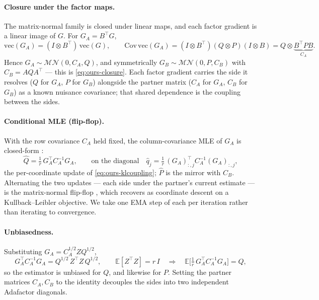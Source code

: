 \documentclass[11pt]{article}
\newcommand{\E}{\mathbb{E}}
\theoremstyle{plain}
\theoremstyle{definition}
\theoremstyle{remark}
\begin{document}
\paragraph{Closure under the factor maps.} The matrix-normal family is closed under
linear maps, and each factor gradient is a linear image of $G$. For $G_A=B^\top G$,
\begin{equation*}
  \mathrm{vec}(G_A)=(I\otimes B^\top)\,\mathrm{vec}(G),\qquad
  \mathrm{Cov}\,\mathrm{vec}(G_A)=(I\otimes B^\top)(Q\otimes P)(I\otimes B)
  =Q\otimes\underbrace{B^\top P B}_{C_A}.
\end{equation*}
Hence $G_A\sim\mathcal{MN}(0,C_A,Q)$, and symmetrically $G_B\sim\mathcal{MN}(0,P,C_B)$
with $C_B=AQA^\top$ --- this is \eqref{eq:ours-closure}. Each factor gradient carries
the side it resolves ($Q$ for $G_A$, $P$ for $G_B$) alongside the partner matrix ($C_A$ for $G_A$, $C_B$ for $G_B$) as
a known nuisance covariance; that shared dependence is the coupling between the sides.

\paragraph{Conditional MLE (flip-flop).} With the row covariance $C_A$ held fixed, the
column-covariance MLE of $G_A$ is closed-form \cite{dutilleul}:
\begin{equation*}
  \hat Q=\tfrac1r\,G_A^\top C_A^{-1}G_A,
  \qquad\text{on the diagonal}\quad
  \hat q_j=\tfrac1r\,(G_A)_{:,j}^\top C_A^{-1}(G_A)_{:,j},
\end{equation*}
the per-coordinate update of \eqref{eq:ours-klcoupling}; $\hat P$ is the mirror with
$C_B$. Alternating the two updates --- each side under the partner's current estimate
--- is the matrix-normal flip-flop \cite{dutilleul}, which \cite{klshampoo} recovers as
coordinate descent on a Kullback--Leibler objective. We take one EMA step of each per
iteration rather than iterating to convergence.

\paragraph{Unbiasedness.} Substituting $G_A=C_A^{1/2}ZQ^{1/2}$,
\begin{equation*}
  G_A^\top C_A^{-1}G_A=Q^{1/2}\,Z^\top Z\,Q^{1/2},\qquad
  \E[Z^\top Z]=r\,I
  \quad\Longrightarrow\quad
  \E\!\big[\tfrac1r\,G_A^\top C_A^{-1}G_A\big]=Q,
\end{equation*}
so the estimator is unbiased for $Q$, and likewise for $P$. Setting the partner matrices
$C_A,C_B$ to the identity decouples the sides into two independent
Adafactor diagonals.
\end{document}
